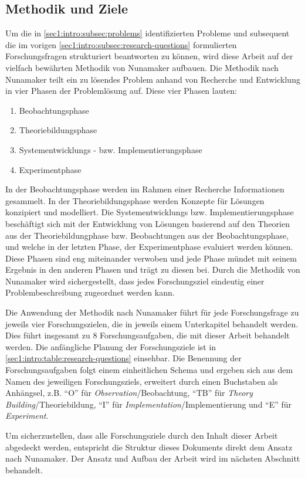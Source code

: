\subsection{Methodik und Ziele}
\label{sec1:intro:subsec:methodology-goals}
Um die in \cref{sec1:intro:subsec:problems} identifizierten Probleme und subsequent die im vorigen \cref{sec1:intro:subsec:research-questions} formulierten Forschungsfragen strukturiert beantworten zu können, wird diese Arbeit auf der vielfach bewährten Methodik von Nunamaker \cite{nunamaker} aufbauen.
Die Methodik nach Nunamaker teilt ein zu lösendes Problem anhand von Recherche und Entwicklung in vier Phasen der Problemlösung auf.
\newline
Diese vier Phasen lauten:
\begin{enumerate}
    \setlength{\itemsep}{0pt}
    \item Beobachtungsphase
    \item Theoriebildungsphase
    \item Systementwicklungs - bzw. Implementierungsphase
    \item Experimentphase
\end{enumerate}

In der Beobachtungsphase werden im Rahmen einer Recherche Informationen gesammelt.
In der Theoriebildungsphase werden Konzepte für Lösungen konzipiert und modelliert.
Die Systementwicklungs bzw. Implementierungsphase beschäftigt sich mit der Entwicklung von Lösungen basierend auf den Theorien aus der Theoriebildungphase bzw. Beobachtungen aus der Beobachtungsphase, und welche in der letzten Phase, der Experimentphase evaluiert werden können.
Diese Phasen sind eng miteinander verwoben und jede Phase mündet mit seinem Ergebnis in den anderen Phasen und trägt zu diesen bei.
Durch die Methodik von Nunamaker wird sichergestellt, dass jedes Forschungsziel eindeutig einer Problembeschreibung zugeordnet werden kann.

Die Anwendung der Methodik nach Nunamaker führt für jede Forschungsfrage zu jeweils vier Forschungszielen, die in jeweils einem Unterkapitel behandelt werden.
Dies führt insgesamt zu 8 Forschungsaufgaben, die mit dieser Arbeit behandelt werden.
Die anfängliche Planung der Forschungsziele ist in \cref{sec1:intro:table:research-questions} einsehbar.
Die Benennung der Forschungsaufgaben folgt einem einheitlichen Schema und ergeben sich aus dem Namen des jeweiligen Forschungsziels, erweitert durch einen Buchstaben als Anhängsel, z.B. \enquote{O}
 für \textit{Observation}/Beobachtung, \enquote{TB} für \textit{Theory Building}/Theoriebildung, \enquote{I} für \textit{Implementation}/Implementierung und \enquote{E} für \textit{Experiment}.
 \clearpage

\noindent
Um sicherzustellen, dass alle Forschungsziele durch den Inhalt dieser Arbeit abgedeckt werden, entspricht die Struktur dieses Dokuments direkt dem Ansatz nach Nunamaker.
Der Ansatz und Aufbau der Arbeit wird im nächsten Abschnitt behandelt.

